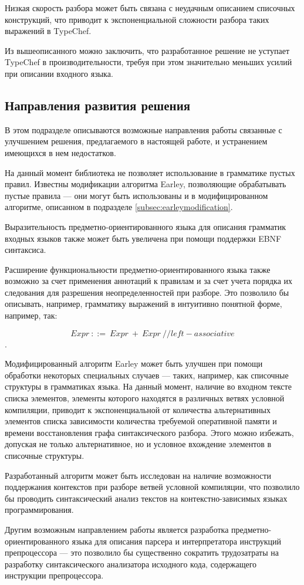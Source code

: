 Низкая скорость разбора может быть связана с неудачным описанием списочных конструкций, что приводит к экспоненциальной сложности разбора таких выражений в TypeChef.

Из вышеописанного можно заключить, что разработанное решение не уступает TypeChef в производительности, требуя при этом значительно меньших усилий при описании входного языка.

\subsection{Направления развития решения}

В этом подразделе описываются возможные направления работы связанные с улучшением решения, предлагаемого в настоящей работе, и устранением имеющихся в нем недостатков. 

На данный момент библиотека не позволяет использование в грамматике пустых правил. Известны модификации алгоритма Earley, позволяющие обрабатывать пустые правила \cite{emptyrules} --- они могут быть использованы и в модифицированном алгоритме, описанном в подразделе \ref{subsec:earleymodification}.

Выразительность предметно-ориентированного языка для описания грамматик входных языков также может быть увеличена при помощи поддержки EBNF синтаксиса.

Расширение функциональности предметно-ориентированного языка также возможно за счет применения аннотаций к правилам и за счет учета порядка их следования для разрешения неопределенностей при разборе. Это позволило бы описывать, например, грамматику выражений в интуитивно понятной форме, например, так: 

$$Expr\ ::=\ Expr\ +\ Expr\ //left-associative$$.

Модифицированный алгоритм Earley может быть улучшен при помощи обработки некоторых специальных случаев --- таких, например, как списочные структуры в грамматиках языка. На данный момент, наличие во входном тексте списка элементов, элементы которого находятся в различных ветвях условной компиляции, приводит к экспоненциальной от количества альтернативных элементов списка зависимости количества требуемой оперативной памяти и времени восстановления графа синтаксического разбора. Этого можно избежать, допуская не только альтернативное, но и условное вхождение элементов в списочные структуры.

Разработанный алгоритм может быть исследован на наличие возможности поддержания контекстов при разборе ветвей условной компиляции, что позволило бы проводить синтаксический анализ текстов на контекстно-зависимых языках программирования.

Другим возможным направлением работы является разработка предметно-ориентированного языка для описания парсера и интерпретатора инструкций препроцессора --- это позволило бы существенно сократить трудозатраты на разработку синтаксического анализатора исходного кода, содержащего инструкции препроцессора.
